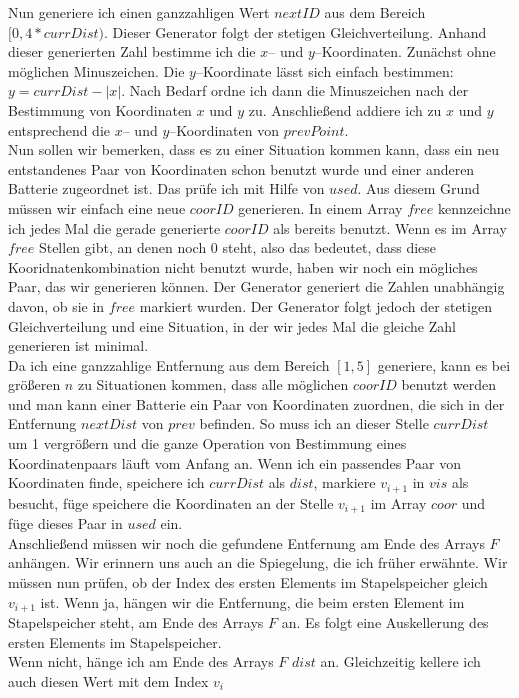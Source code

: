 \documentclass[a4paper,10pt,ngerman]{scrartcl}
\begin{document}
Nun generiere ich einen ganzzahligen Wert $nextID$ aus dem Bereich $[0, 4*currDist)$.
Dieser Generator folgt der stetigen Gleichverteilung.
Anhand dieser generierten Zahl bestimme ich die $x$-- und $y$--Koordinaten.
Zunächst ohne möglichen Minuszeichen.
Die $y$--Koordinate lässt sich einfach bestimmen: $y = currDist - |x|$.
Nach Bedarf ordne ich dann die Minuszeichen nach der Bestimmung von Koordinaten $x$ und $y$ zu.
Anschließend addiere ich zu $x$ und $y$ entsprechend die $x$-- und $y$--Koordinaten von $prevPoint$.\\
Nun sollen wir bemerken, dass es zu einer Situation kommen kann, dass ein neu entstandenes Paar von Koordinaten 
schon benutzt wurde und einer anderen Batterie zugeordnet ist. Das prüfe ich mit Hilfe von $used$.
Aus diesem Grund müssen wir einfach eine neue $coorID$ generieren.
In einem Array $free$ kennzeichne ich jedes Mal die gerade generierte $coorID$ als bereits benutzt.
Wenn es im Array $free$ Stellen gibt, an denen noch 0 steht, also das bedeutet, dass diese Kooridnatenkombination nicht benutzt wurde, haben wir noch ein mögliches Paar, das wir generieren können.
Der Generator generiert die Zahlen unabhängig davon, ob sie in $free$ markiert wurden.
Der Generator folgt jedoch der stetigen Gleichverteilung und eine Situation, in der
wir jedes Mal die gleiche Zahl generieren ist minimal.\\
Da ich eine ganzzahlige Entfernung aus dem Bereich $[1,5]$ generiere, kann es bei größeren $n$ zu Situationen kommen, 
dass alle möglichen $coorID$ benutzt werden und man kann einer Batterie ein Paar von Koordinaten zuordnen, die sich
in der Entfernung $nextDist$ von $prev$ befinden. So muss ich an dieser Stelle $currDist$ um 1 vergrößern und die ganze
Operation von Bestimmung eines Koordinatenpaars läuft vom Anfang an. Wenn ich ein passendes Paar von Koordinaten finde,
speichere ich $currDist$ als $dist$, markiere $v_{i+1}$ in $vis$ als besucht, füge speichere die Koordinaten
an der Stelle $v_{i+1}$ im Array $coor$ und füge dieses Paar in $used$ ein.\\
Anschließend müssen wir noch die gefundene Entfernung am Ende des Arrays $F$ anhängen.
Wir erinnern uns auch an die Spiegelung, die ich früher erwähnte. Wir müssen nun prüfen, ob der Index
des ersten Elements im Stapelspeicher gleich $v_{i+1}$ ist.
Wenn ja, hängen wir die Entfernung, die beim ersten Element im Stapelspeicher steht, am Ende des Arrays $F$ an.
Es folgt eine Auskellerung des ersten Elements im Stapelspeicher.\\
Wenn nicht, hänge ich am Ende des Arrays $F$ $dist$ an. Gleichzeitig kellere ich auch diesen Wert mit dem Index $v_i$
\end{document}
